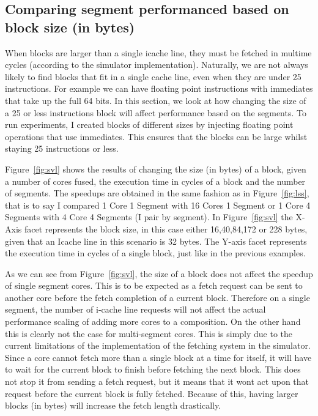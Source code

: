 \subsection{Comparing segment performanced based on block size (in bytes)}

When blocks are larger than a single icache line, they must be fetched in multime cycles (according to the simulator implementation).
Naturally, we are not always likely to find blocks that fit in a single cache line, even when they are under 25 instructions.
For example we can have floating point instructions with immediates that take up the full 64 bits.
In this section, we look at how changing the size of a 25 or less instructions block will affect performance based on the segments. 
To run experiments, I created blocks of different sizes by injecting floating point operations that use immediates.
This ensures that the blocks can be large whilst staying 25 instructions or less.

Figure~\ref{fig:svl} shows the results of changing the size (in bytes) of a block, given a number of cores fused, the execution time in cycles of a block and the number of segments.
The speedups are obtained in the same fashion as in Figure~\ref{fig:lss}, that is to say I compared 1 Core 1 Segment with 16 Cores 1 Segment or 1 Core 4 Segments with 4 Core 4 Segments (I pair by segment).
In Figure~\ref{fig:svl} the X-Axis facet represents the block size, in this case either 16,40,84,172 or 228 bytes, given that an Icache line in this scenario is 32 bytes.
The Y-axis facet represents the execution time in cycles of a single block, just like in the previous examples.

As we can see from Figure~\ref{fig:svl}, the size of a block does not affect the speedup of single segment cores.
This is to be expected as a fetch request can be sent to another core before the fetch completion of a current block.
Therefore on a single segment, the number of i-cache line requests will not affect the actual performance scaling of adding more cores to a composition.
On the other hand this is clearly not the case for multi-segment cores.
This is simply due to the current limitations of the implementation of the fetching system in the simulator.
Since a core cannot fetch more than a single block at a time for itself, it will have to wait for the current block to finish before fetching the next block.
This does not stop it from sending a fetch request, but it means that it wont act upon that request before the current block is fully fetched.
Because of this, having larger blocks (in bytes) will increase the fetch length drastically.

